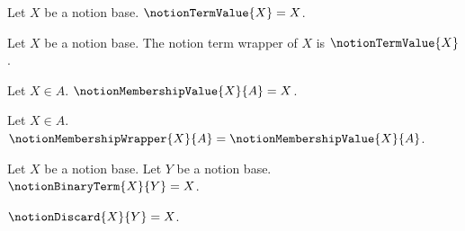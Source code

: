 

\begin{definition}\label{notion_term_value}
    Let $X$ be a notion base.
    $\notionTermValue{X}=X$.
\end{definition}

\begin{definition}\label{notion_term_wrapper}
    Let $X$ be a notion base.
    The notion term wrapper of $X$ is $\notionTermValue{X}$.
\end{definition}

\begin{definition}\label{notion_membership_value}
    Let $X\in A$.
    $\notionMembershipValue{X}{A}=X$.
\end{definition}

\begin{definition}\label{notion_membership_wrapper}
    Let $X\in A$.
    $\notionMembershipWrapper{X}{A}=\notionMembershipValue{X}{A}$.
\end{definition}

\begin{definition}\label{notion_binary_term}
    Let $X$ be a notion base.
    Let $Y$ be a notion base.
    $\notionBinaryTerm{X}{Y}=X$.
\end{definition}


\begin{abbreviation}\label{notion_discard_argument}
    $\notionDiscard{X}{Y}=X$.
\end{abbreviation}

